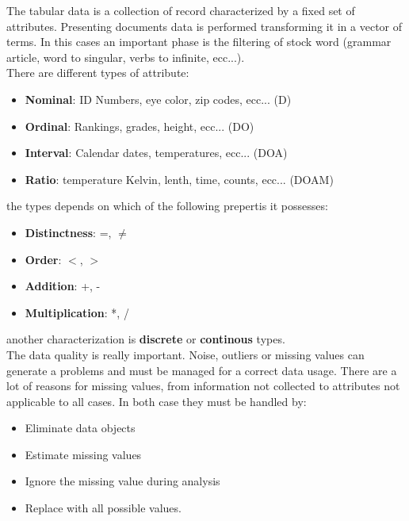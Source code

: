 \documentclass[12pt]{article}
\begin{document}
The tabular data is a collection of record characterized by a fixed set of attributes. Presenting documents data is performed transforming it in a vector of terms. In this cases an important phase is the filtering of stock word (grammar article, word to singular, verbs to infinite, ecc...).\\
There are different types of attribute:
\begin{itemize}
  \item \textbf{Nominal}: ID Numbers, eye color, zip codes, ecc... (D)
  \item \textbf{Ordinal}: Rankings, grades, height, ecc... (DO)
  \item \textbf{Interval}: Calendar dates, temperatures, ecc... (DOA)
  \item \textbf{Ratio}: temperature Kelvin, lenth, time, counts, ecc... (DOAM)
\end{itemize}
the types depends on which of the following prepertis it possesses:
\begin{itemize}
  \item \textbf{Distinctness}: =, $\neq$
  \item \textbf{Order}: $<$, $>$
  \item \textbf{Addition}: +, -
  \item \textbf{Multiplication}: *, /
\end{itemize}
another characterization is \textbf{discrete} or \textbf{continous} types.\\
The data quality is really important. Noise, outliers or missing values can generate a problems and must be managed for a correct data usage. There are a lot of reasons for missing values, from information not collected to attributes not applicable to all cases. In both case they must be handled by:
\begin{itemize}
  \item Eliminate data objects
  \item Estimate missing values
  \item Ignore the missing value during analysis
  \item Replace with all possible values.
\end{itemize}
\end{document}
